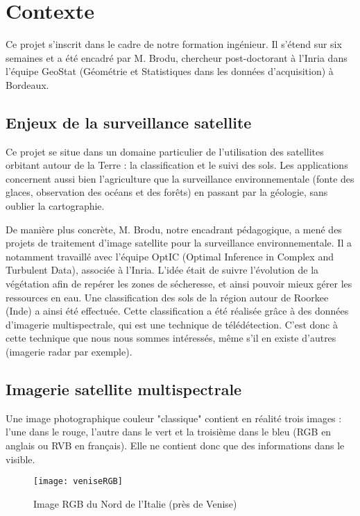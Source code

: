 
\section{Contexte}

Ce projet s'inscrit dans le cadre de notre formation ingénieur. Il s'étend sur six semaines et a été encadré par M. Brodu, chercheur post-doctorant à l'Inria dans l'équipe GeoStat (Géométrie et Statistiques dans les données d'acquisition) à Bordeaux. 

\subsection{Enjeux de la surveillance satellite}

Ce projet se situe dans un domaine particulier de l'utilisation des satellites orbitant autour de la Terre : la classification et le suivi des sols. 
Les applications concernent aussi bien l'agriculture que la surveillance environnementale (fonte des glaces, observation des océans et des forêts) en passant par la géologie, sans oublier la cartographie.

De manière plus concrète, M. Brodu, notre encadrant pédagogique, a mené des projets de traitement d'image satellite pour la surveillance environnementale. Il a notamment travaillé avec l'équipe OptIC (Optimal Inference in Complex and Turbulent Data), associée à l'Inria. L'idée était de suivre l'évolution de la végétation afin de repérer les zones de sécheresse, et ainsi pouvoir mieux gérer les ressources en eau. Une classification des sols de la région autour de Roorkee (Inde) a ainsi été effectuée. 
Cette classification a été réalisée grâce à des données d'imagerie multispectrale, qui est une technique de télédétection. C'est donc à cette technique que nous nous sommes intéressés, même s'il en existe d'autres (imagerie radar par exemple). 

\subsection{Imagerie satellite multispectrale}

Une image photographique couleur "classique" contient en réalité trois images : l'une dans le rouge, l'autre dans le vert et la troisième dans le bleu (RGB en anglais ou RVB en français). Elle ne contient donc que des informations dans le visible. 
\begin{figure}[H]
  \centering
    \texttt{[image: veniseRGB]}
  \caption{Image RGB du Nord de l'Italie (près de Venise)}
  \label{fig:veniseRGB}
\end{figure}

